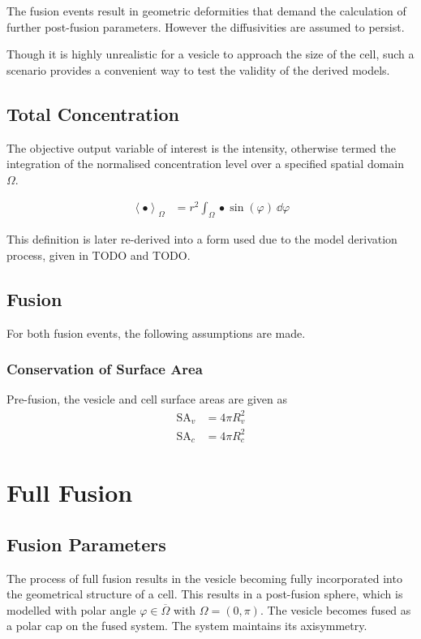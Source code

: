 \documentclass{report}
\newcommand\Angle[1]{{ \left\langle{#1}\right\rangle }}
\newcommand\SA{{ \text{SA} }}
\begin{document}
The fusion events result in geometric deformities that demand the calculation of further post-fusion parameters. However the diffusivities are assumed to persist.

Though it is highly unrealistic for a vesicle to approach the size of the cell, such a scenario provides a convenient way to test the validity of the derived models.

\section{Total Concentration}
The objective output variable of interest is the intensity, otherwise termed the integration of the normalised concentration level over a specified spatial domain $\Omega$.

\begin{align*}
	\Angle{\bullet}_\Omega &= r^2 \int_\Omega \bullet \sin(\varphi)\ \dd\varphi
\end{align*}

This definition is later re-derived into a form used due to the model derivation process, given in TODO and TODO.

\section{Fusion}

For both fusion events, the following assumptions are made.

\subsection{Conservation of Surface Area}
Pre-fusion, the vesicle and cell surface areas are given as
\begin{align*}
	\SA_v &= 4\pi R_v^2 \\
	\SA_c &= 4\pi R_c^2
\end{align*}

\chapter{Full Fusion}
\section{Fusion Parameters}
The process of full fusion results in the vesicle becoming fully incorporated into the geometrical structure of a cell. This results in a post-fusion sphere, which is modelled with polar angle $\varphi \in \overline\Omega$ with $\Omega = (0, \pi)$. The vesicle becomes fused as a polar cap on the fused system. The system maintains its axisymmetry.
\end{document}

